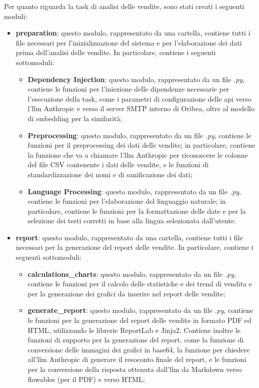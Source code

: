 Per quanto riguarda la task di analisi delle vendite, sono stati creati i seguenti moduli:
\begin{itemize}
    \item \textbf{preparation}: questo modulo, rappresentato da una cartella, contiene tutti i file necessari per l'inizializzazione del sistema e per l'elaborazione dei dati prima dell'analisi delle vendite. In particolare, contiene i seguenti sottomoduli:
    \begin{itemize}
        \item \textbf{Dependency Injection}: questo modulo, rappresentato da un file \emph{.py}, contiene le funzioni per l'iniezione delle dipendenze necessarie per l'esecuzione della task, come i parametri di configurazione delle \gls{api} verso l'\gls{llm}\glsfirstoccur{} Anthropic e verso il server SMTP interno di Oribea, oltre al modello di embedding per la similarità;
        \item \textbf{Preprocessing}: questo modulo, rappresentato da un file \emph{.py}, contiene le funzioni per il preprocessing dei dati delle vendite; in particolare, contiene la funzione che va a chiamare l'\gls{llm} Anthropic per riconoscere le colonne del file CSV contenente i dati delle vendite, e le funzioni di standardizzazione dei nomi e di sanificazione dei dati;
        \item \textbf{Language Processing}: questo modulo, rappresentato da un file \emph{.py}, contiene le funzioni per l'elaborazione del linguaggio naturale; in particolare, contiene le funzioni per la formattazione delle date e per la selezione dei testi corretti in base alla lingua selezionata dall'utente.
    \end{itemize}
    \item \textbf{report}: questo modulo, rappresentato da una cartella, contiene tutti i file necessari per la generazione del report delle vendite. In particolare, contiene i seguenti sottomoduli:
    \begin{itemize}
        \item \textbf{calculations\_charts}: questo modulo, rappresentato da un file \emph{.py}, contiene le funzioni per il calcolo delle statistiche e dei trend di vendita e per la generazione dei grafici da inserire nel report delle vendite;
        \item \textbf{generate\_report}: questo modulo, rappresentato da un file \emph{.py}, contiene le funzioni per la generazione del report delle vendite in formato PDF ed HTML, utilizzando le librerie ReportLab e Jinja2. Contiene inoltre le funzioni di supporto per la generazione del report, come la funzione di conversione delle immagini dei grafici in base64, la funzione per chiedere all'\gls{llm} Anthropic di generare il resoconto finale del report, e le funzioni per la conversione della risposta ottenuta dall'\gls{llm} da Markdown verso flowables (per il PDF) e verso HTML;

\end{itemize}
\end{itemize}
